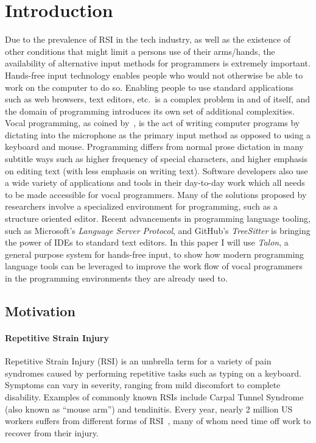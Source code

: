 \documentclass[../thesis.tex]{subfiles}
\begin{document}
\chapter{Introduction}
Due to the prevalence of RSI in the tech industry, as well as the existence of other conditions that might limit a persons use of their arms/hands, the availability
of alternative input methods for programmers is extremely important.
Hands-free input technology enables people who would not otherwise be able to work on the computer to do so.
Enabling people to use standard applications such as web browsers, text editors, etc.\ is a complex problem in and of itself, and the domain of programming
introduces its own set of additional complexities.
Vocal programming, as coined by~\parencite{Arnold}, is the act of writing computer programs by dictating into the microphone as the primary input method as opposed to using a keyboard and mouse.
Programming differs from normal prose dictation in many subtitle ways such as higher frequency of special characters, and higher emphasis on editing text (with less emphasis on writing text).
Software developers also use a wide variety of applications and tools in their day-to-day work which all needs to be made accessible for vocal programmers.
Many of the solutions proposed by researchers involve a specialized environment for programming, such as a structure oriented editor.
Recent advancements in programming language tooling, such as Microsoft's \textit{Language Server Protocol}, and GitHub's \textit{TreeSitter} is bringing the power of IDEs to standard text editors.
In this paper I will use \textit{Talon}, a general purpose system for hands-free input, to show how modern programming language
   tools can be leveraged to improve the work flow of vocal programmers in the programming environments they are already used to.

\section{Motivation}

\subsubsection{Repetitive Strain Injury}
Repetitive Strain Injury (RSI) is an umbrella term for a variety of pain syndromes caused by
performing repetitive tasks such as typing on a keyboard.
Symptoms can vary in severity, ranging from mild discomfort to complete disability.
Examples of commonly known RSIs include Carpal Tunnel Syndrome (also known as ``mouse arm'') and tendinitis.
Every year, nearly 2 million US workers suffers from different forms of RSI~\parencite{rsi}, many of whom
need time off work to recover from their injury.
\end{document}
